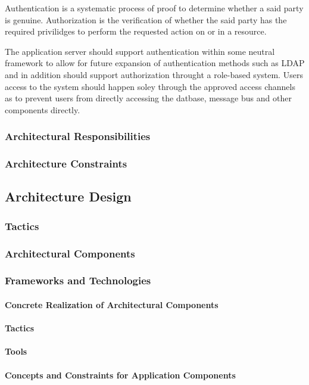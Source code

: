 Authentication is a systematic process of proof to determine whether a said
party is genuine.  Authorization is the verification of whether the said party
has the required privilidges to perform the requested action on or in a resource.

The application server should support authentication within some neutral framework
to allow for future expansion of authentication methods such as LDAP and in addition
should support authorization throught a role-based system. Users access to the
system should happen soley through the approved access channels as to prevent users
from directly accessing the datbase, message bus and other components directly.

\subsubsection{Architectural Responsibilities}
\subsubsection{Architecture Constraints}
\subsection{Architecture Design}
\subsubsection{Tactics}
\subsubsection{Architectural Components}
\subsubsection{Frameworks and Technologies}
\paragraph{Concrete Realization of Architectural Components}
\paragraph{Tactics}
\paragraph{Tools}
\paragraph{Concepts and Constraints for Application Components}